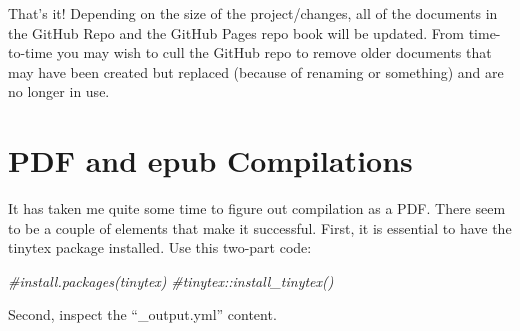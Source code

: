 \documentclass[
]{book}
\newenvironment{Shaded}{\begin{snugshade}}{\end{snugshade}}
\newcommand{\CommentTok}[1]{\textcolor[rgb]{0.56,0.35,0.01}{\textit{#1}}}
\begin{document}
That's it! Depending on the size of the project/changes, all of the documents in the GitHub Repo and the GitHub Pages repo book will be updated. From time-to-time you may wish to cull the GitHub repo to remove older documents that may have been created but replaced (because of renaming or something) and are no longer in use.

\hypertarget{pdf-and-epub-compilations}{%
\section{PDF and epub Compilations}\label{pdf-and-epub-compilations}}

It has taken me quite some time to figure out compilation as a PDF. There seem to be a couple of elements that make it successful. First, it is essential to have the tinytex package installed. Use this two-part code:

\begin{Shaded}
\begin{Highlighting}[]
\CommentTok{\#install.packages(\textquotesingle{}tinytex\textquotesingle{})}
\CommentTok{\#tinytex::install\_tinytex()}
\end{Highlighting}
\end{Shaded}

Second, inspect the ``\_output.yml'' content.
\end{document}
